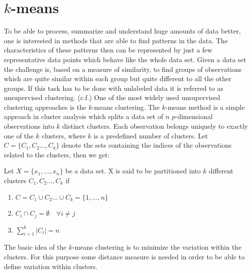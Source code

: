 

\chapter{$k$-means}
\label{cha:K-means}

To be able to process, summarize and understand huge amounts of data better, one is interested in methods that are able to find patterns in the data. The characteristics of these patterns then can be represented by just a few representative data points which behave like the whole data set. Given a  data set the challenge is, based on a measure of similarity, to find groups of observations which are quite similar within each group but quite different to all the other groups. If this task has to be done with unlabeled data it is referred to as unsupervised clustering. (c.f.\cite{jain2010data}) One of the most widely used unsupervised clustering approaches is the $k$-means clustering. The $k$-means method is a simple approach in cluster analysis which splits a data set of $n$ $p$-dimensional observations into $k$ distinct clusters. Each observation belongs uniquely to exactly one of the $k$ clusters, where $k$ is a predefined number of clusters. Let $C=\{C_1, C_2 \dots, C_k\}$ denote the sets containing the indices of the observations  related to the clusters, then we get:
\begin{definition}
Let $X=\{x_1, ..., x_n\}$ be a data set. X is said to be partitioned into $k$ different clusters $C_1, C_2 \dots, C_k$ if
	\begin{enumerate}[label=(\roman*)] \centering
		\item $C = C_1 \cup C_2 \dots \cup C_k = \{1, \dots, n\}$

		\item $C_i \cap C_j = \emptyset \quad \forall i \neq j$
		\item $\sum_{i=1}^k |C_i| = n$
	\end{enumerate}
\end{definition}
The basic idea of the $k$-means clustering is to minimize the variation within the clusters. For this purpose some distance measure is needed in order to be able to define variation within clusters.
